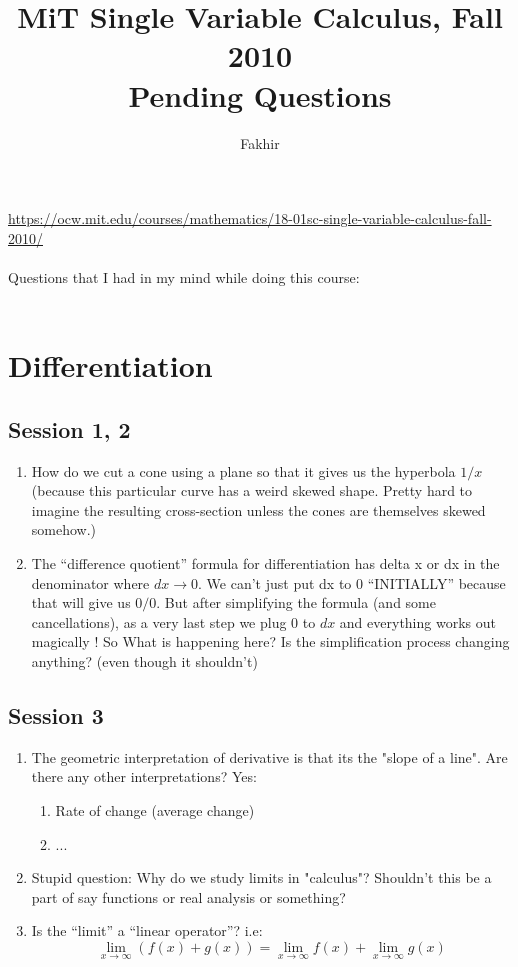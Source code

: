 \documentclass[]{article}
\title{MiT Single Variable Calculus, Fall 2010 \\ Pending Questions}
\author{Fakhir}
\begin{document}
\maketitle

\url{https://ocw.mit.edu/courses/mathematics/18-01sc-single-variable-calculus-fall-2010/}\\~\\

Questions that I had in my mind while doing this course: \\~\\

\section{Differentiation}
\subsection{Session 1, 2}
\begin{enumerate}
	\item How do we cut a cone using a plane so that it gives us the hyperbola $1/x$ (because this particular curve has a weird skewed shape. Pretty hard to imagine the resulting cross-section unless the cones are themselves skewed somehow.)
	
	\item The ``difference quotient'' formula for differentiation has delta x or dx in the denominator where $dx \rightarrow 0$. We can't just put dx to 0 ``INITIALLY'' because that will give us $0/0$. But after simplifying the formula (and some cancellations), as a very last step we plug 0 to $dx$ and everything works out magically ! So What is happening here? Is the simplification process changing anything? (even though it shouldn't)
\end{enumerate}

\subsection{Session 3}

\begin{enumerate}
	\item The geometric interpretation of derivative is that its the "slope of a line". Are there any other interpretations? 
	Yes:
	\begin{enumerate}
		\item Rate of change (average change)
		\item ...
	\end{enumerate}

	\item Stupid question: Why do we study limits in "calculus"? Shouldn't this be a part of say functions or real analysis or something?
	
	\item Is the ``limit'' a ``linear operator''? i.e: 
	$$\lim_{x\to\infty} \left(f(x)+g(x)\right) = \lim_{x\to\infty} f(x) + \lim_{x\to\infty} g(x)$$
		
\end{enumerate}
\end{document}
